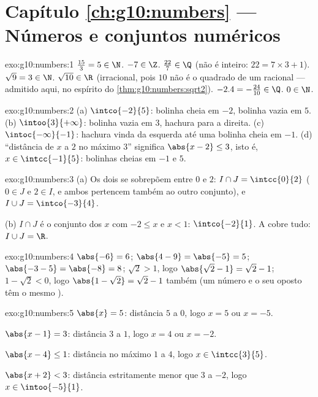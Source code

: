 \section*{Capítulo \ref{ch:g10:numbers} --- Números e conjuntos numéricos}

\begin{solution}{exo:g10:numbers:1}
$\frac{15}{3} = 5 \in \N$. \quad $-7 \in \Z$. \quad
$\frac{22}{7} \in \Q$ (não é inteiro: $22 = 7 \times 3 + 1$).
\quad $\sqrt 9 = 3 \in \N$. \quad $\sqrt{10} \in \R$ (irracional, pois
$10$ não é o quadrado de um racional --- admitido aqui, no espírito do
\cref{thm:g10:numbers:sqrt2}). \quad $-2.4 = -\frac{24}{10} \in \Q$.
\quad $0 \in \N$.
\end{solution}

\begin{solution}{exo:g10:numbers:2}
(a) $\intco{-2}{5}$: bolinha cheia em $-2$, bolinha vazia em $5$.
(b) $\intoo{3}{+\infty}$: bolinha vazia em $3$, hachura para a direita.
(c) $\intoc{-\infty}{-1}$: hachura vinda da esquerda até uma bolinha
cheia em $-1$.
(d) ``distância de $x$ a $2$ no máximo $3$'' significa
$\abs{x - 2} \leq 3$, isto é, $x \in \intcc{-1}{5}$: bolinhas cheias em
$-1$ e $5$.
\end{solution}

\begin{solution}{exo:g10:numbers:3}
(a) Os dois  se sobrepõem entre $0$ e $2$:
$I \cap J = \intcc{0}{2}$ ($0 \in J$ e $2 \in I$, e ambos pertencem
também ao outro conjunto), e $I \cup J = \intco{-3}{4}$.

(b) $I \cap J$ é o conjunto dos $x$ com $-2 \leq x$ e $x < 1$:
$\intco{-2}{1}$. A  cobre tudo: $I \cup J = \R$.
\end{solution}

\begin{solution}{exo:g10:numbers:4}
$\abs{-6} = 6$; \quad $\abs{4 - 9} = \abs{-5} = 5$; \quad
$\abs{-3 - 5} = \abs{-8} = 8$; \quad
$\sqrt 2 > 1$, logo $\abs{\sqrt2 - 1} = \sqrt2 - 1$; \quad
$1 - \sqrt2 < 0$, logo $\abs{1 - \sqrt2} = \sqrt2 - 1$ também (um número
e o seu oposto têm o mesmo ).
\end{solution}

\begin{solution}{exo:g10:numbers:5}
$\abs{x} = 5$: distância $5$ a $0$, logo $x = 5$ ou $x = -5$.

$\abs{x - 1} = 3$: distância $3$ a $1$, logo $x = 4$ ou $x = -2$.

$\abs{x - 4} \leq 1$: distância no máximo $1$ a $4$, logo
$x \in \intcc{3}{5}$.

$\abs{x + 2} < 3$: distância estritamente menor que $3$ a $-2$, logo
$x \in \intoo{-5}{1}$.
\end{solution}

